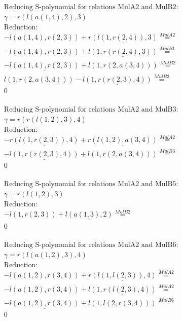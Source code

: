 \documentclass[11pt]{amsart}
\begin{document}
\begin{align*} 
& \text{Reducing S-polynomial for relations MulA2 and MulB2:} \\ 
& \gamma = r(l(a(1,4),2),3) \\ 
& \text{Reduction}: \\& - l(a(1,4),r(2,3)) + \underline{r(l(1,r(2,4)),3)} \stackrel{ MulA2 }{=}  \\ 
& - l(a(1,4),r(2,3)) + \underline{l(1,r(r(2,4),3))} \stackrel{ MulB1 }{=}  \\ 
& - \underline{l(a(1,4),r(2,3))} + l(1,r(2,a(3,4))) \stackrel{ MulB2 }{=}  \\ 
&l(1,r(2,a(3,4))) - \underline{l(1,r(r(2,3),4))} \stackrel{ MulB3 }{=}  \\ 
&0\\ 
\end{align*} 
 
\begin{align*} 
& \text{Reducing S-polynomial for relations MulA2 and MulB3:} \\ 
& \gamma = r(r(l(1,2),3),4) \\ 
& \text{Reduction}: \\& - \underline{r(l(1,r(2,3)),4)} + \underline{r(l(1,2),a(3,4))} \stackrel{ MulA2 }{=}  \\ 
& - \underline{l(1,r(r(2,3),4))} + l(1,r(2,a(3,4))) \stackrel{ MulB3 }{=}  \\ 
&0\\ 
\end{align*} 
 
\begin{align*} 
& \text{Reducing S-polynomial for relations MulA2 and MulB5:} \\ 
& \gamma = r(l(1,2),3) \\ 
& \text{Reduction}: \\& - l(1,r(2,3)) + \underline{l(a(1,3),2)} \stackrel{ MulB2 }{=}  \\ 
&0\\ 
\end{align*} 
 
\begin{align*} 
& \text{Reducing S-polynomial for relations MulA2 and MulB6:} \\ 
& \gamma = r(l(a(1,2),3),4) \\ 
& \text{Reduction}: \\& - l(a(1,2),r(3,4)) + \underline{r(l(1,l(2,3)),4)} \stackrel{ MulA2 }{=}  \\ 
& - l(a(1,2),r(3,4)) + \underline{l(1,r(l(2,3),4))} \stackrel{ MulA2 }{=}  \\ 
& - \underline{l(a(1,2),r(3,4))} + l(1,l(2,r(3,4))) \stackrel{ MulB6 }{=}  \\ 
&0\\ 
\end{align*} 
 
\end{document}
